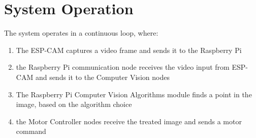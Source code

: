 \section{System Operation}
The system operates in a continuous loop, where:
\begin{enumerate}
    \item The ESP-CAM captures a video frame and sends it to the Raspberry Pi
    \item the Raspberry Pi communication node receives the video input from ESP-CAM and sends it to the Computer Vision nodes 
    \item The Raspberry Pi Computer Vision Algorithms module finds a point in the image, based on the algorithm choice
    \item the Motor Controller nodes receive the treated image and sends a motor command
\end{enumerate}